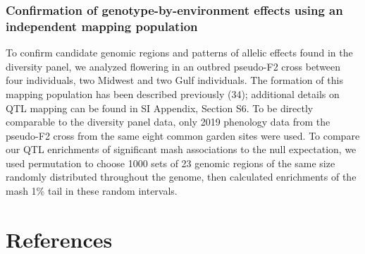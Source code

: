 \documentclass[
  9pt,
  twocolumn,
  twoside]{pnas-new}
\begin{document}
\subsubsection{Confirmation of genotype-by-environment effects using an
independent mapping
population}\label{confirmation-of-genotype-by-environment-effects-using-an-independent-mapping-population-1}

To confirm candidate genomic regions and patterns of allelic effects
found in the diversity panel, we analyzed flowering in an outbred
pseudo-F2 cross between four individuals, two Midwest and two Gulf
individuals. The formation of this mapping population has been described
previously (34); additional details on QTL mapping can be found in SI
Appendix, Section S6. To be directly comparable to the diversity panel
data, only 2019 phenology data from the pseudo-F2 cross from the same
eight common garden sites were used. To compare our QTL enrichments of
significant mash associations to the null expectation, we used
permutation to choose 1000 sets of 23 genomic regions of the same size
randomly distributed throughout the genome, then calculated enrichments
of the mash 1\% tail in these random intervals.

\section{References}\label{references}

\bibsplit[2]
\end{document}
